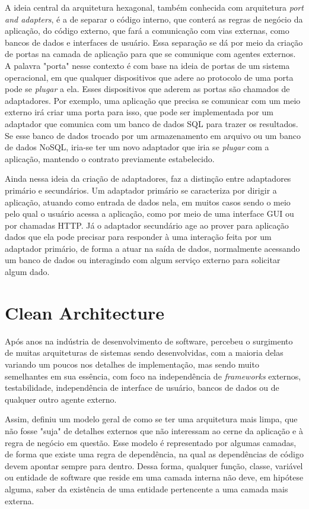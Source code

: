 \documentclass[12pt, %
openright, 
oneside, %
a4paper,    %
brazil]{facom-ufu-abntex2}
\begin{document}
A ideia central da arquitetura hexagonal, também conhecida com arquitetura \textit{port and adapters}, é a de separar o código interno, que conterá as regras de negócio da aplicação, do código externo, que fará a comunicação com vias externas, como bancos de dados e interfaces de usuário. Essa separação se dá por meio da criação de portas na camada de aplicação para que se comunique com agentes externos. A palavra "porta" nesse contexto é com base na ideia de portas de um sistema operacional, em que qualquer dispositivos que adere ao protocolo de uma porta pode se \textit{plugar} a ela. Esses dispositivos que aderem as portas são chamados de adaptadores. Por exemplo, uma aplicação que precisa se comunicar com um meio externo irá criar uma porta para isso, que pode ser implementada por um adaptador que comunica com um banco de dados SQL para trazer os resultados. Se esse banco de dados trocado por um armazenamento em arquivo ou um banco de dados NoSQL, iria-se ter um novo adaptador que iria se \textit{plugar} com a aplicação, mantendo o contrato previamente estabelecido.

Ainda nessa ideia da criação de adaptadores,  faz a distinção entre adaptadores primário e secundários. Um adaptador primário se caracteriza por dirigir a aplicação, atuando como entrada de dados nela, em muitos casos sendo o meio pelo qual o usuário acessa a aplicação, como por meio de uma interface GUI ou por chamadas HTTP. Já o adaptador secundário age ao prover para aplicação dados que ela pode precisar para responder à uma interação feita por um adaptador primário, de forma a atuar na saída de dados, normalmente acessando um banco de dados ou interagindo com algum serviço externo para solicitar algum dado.

\section{Clean Architecture}
Após anos na indústria de desenvolvimento de software,  percebeu o surgimento de muitas arquiteturas de sistemas sendo desenvolvidas, com a maioria delas variando um poucos nos detalhes de implementação, mas sendo muito semelhantes em sua essência, com foco na independência de \textit{frameworks} externos, testabilidade, independência de interface de usuário, bancos de dados ou de qualquer outro agente externo.

Assim,  definiu um modelo geral de como se ter uma arquitetura mais limpa, que não fosse "suja" de detalhes externos que não interessam ao cerne da aplicação e à regra de negócio em questão. Esse modelo é representado por algumas camadas, de forma que existe uma regra de dependência, na qual as dependências de código devem apontar sempre para dentro. Dessa forma, qualquer função, classe, variável ou entidade de software que reside em uma camada interna não deve, em hipótese alguma, saber da existência de uma entidade pertencente a uma camada mais externa.
\end{document}
